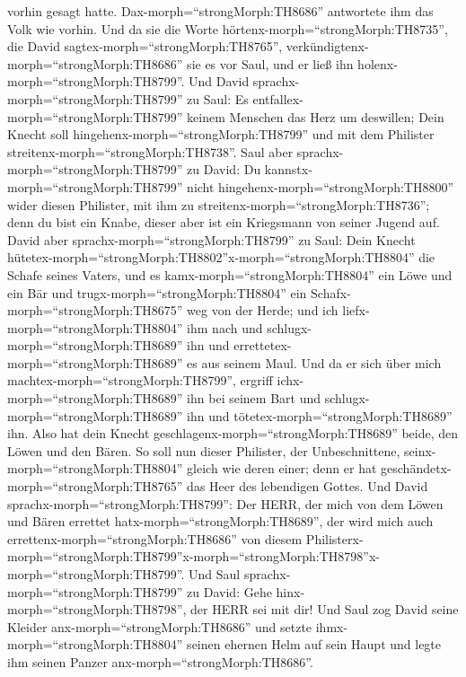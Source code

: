 vorhin gesagt hatte. Dax-morph=``strongMorph:TH8686'' antwortete ihm das
Volk wie vorhin.  Und da sie die Worte
hörtenx-morph=``strongMorph:TH8735'', die David
sagtex-morph=``strongMorph:TH8765'',
verkündigtenx-morph=``strongMorph:TH8686'' sie es vor Saul, und er ließ
ihn holenx-morph=``strongMorph:TH8799''.  Und David
sprachx-morph=``strongMorph:TH8799'' zu Saul: Es
entfallex-morph=``strongMorph:TH8799'' keinem Menschen das Herz um
deswillen; Dein Knecht soll hingehenx-morph=``strongMorph:TH8799'' und
mit dem Philister streitenx-morph=``strongMorph:TH8738''. 
Saul aber sprachx-morph=``strongMorph:TH8799'' zu David: Du
kannstx-morph=``strongMorph:TH8799'' nicht
hingehenx-morph=``strongMorph:TH8800'' wider diesen Philister, mit ihm
zu streitenx-morph=``strongMorph:TH8736''; denn du bist ein Knabe,
dieser aber ist ein Kriegsmann von seiner Jugend auf. 
David aber sprachx-morph=``strongMorph:TH8799'' zu Saul: Dein Knecht
hütetex-morph=``strongMorph:TH8802''x-morph=``strongMorph:TH8804'' die
Schafe seines Vaters, und es kamx-morph=``strongMorph:TH8804'' ein Löwe
und ein Bär und trugx-morph=``strongMorph:TH8804'' ein
Schafx-morph=``strongMorph:TH8675'' weg von der Herde;  und
ich liefx-morph=``strongMorph:TH8804'' ihm nach und
schlugx-morph=``strongMorph:TH8689'' ihn und
errettetex-morph=``strongMorph:TH8689'' es aus seinem Maul. Und da er
sich über mich machtex-morph=``strongMorph:TH8799'', ergriff
ichx-morph=``strongMorph:TH8689'' ihn bei seinem Bart und
schlugx-morph=``strongMorph:TH8689'' ihn und
tötetex-morph=``strongMorph:TH8689'' ihn.  Also hat dein
Knecht geschlagenx-morph=``strongMorph:TH8689'' beide, den Löwen und den
Bären. So soll nun dieser Philister, der Unbeschnittene,
seinx-morph=``strongMorph:TH8804'' gleich wie deren einer; denn er hat
geschändetx-morph=``strongMorph:TH8765'' das Heer des lebendigen Gottes.
 Und David sprachx-morph=``strongMorph:TH8799'': Der HERR,
der mich von dem Löwen und Bären errettet
hatx-morph=``strongMorph:TH8689'', der wird mich auch
errettenx-morph=``strongMorph:TH8686'' von diesem
Philisterx-morph=``strongMorph:TH8799''x-morph=``strongMorph:TH8798''x-morph=``strongMorph:TH8799''.
 Und Saul sprachx-morph=``strongMorph:TH8799'' zu David:
Gehe hinx-morph=``strongMorph:TH8798'', der HERR sei mit dir! Und Saul
zog David seine Kleider anx-morph=``strongMorph:TH8686'' und setzte
ihmx-morph=``strongMorph:TH8804'' seinen ehernen Helm auf sein Haupt und
legte ihm seinen Panzer anx-morph=``strongMorph:TH8686''. 
